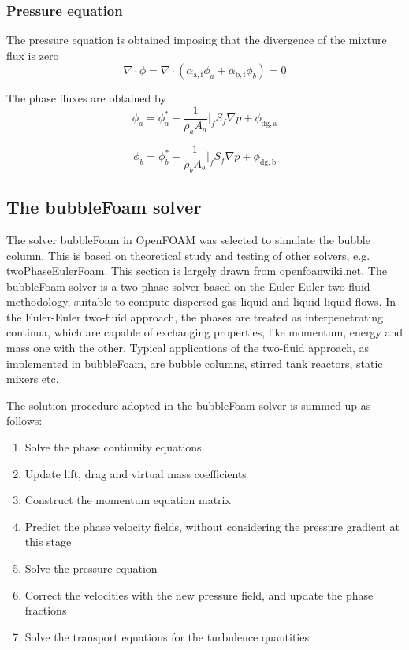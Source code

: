 \documentclass[11pt, a4paper, twoside]{article}
\begin{document}
\subsubsection{Pressure equation}
The pressure equation is obtained imposing that the divergence of the mixture flux is zero
\begin{equation}
\nabla\cdot\phi=\nabla\cdot(\alpha_\mathrm{a,f} \phi_a+\alpha_\mathrm{b,f} \phi_b)=0
\end{equation}

The phase fluxes are obtained by
\begin{equation}
\phi_a=\phi_a^*-\frac{1}{\rho_a A_a}|_f S_f\nabla p+\phi_\mathrm{dg,a}
\end{equation}

\begin{equation}
\phi_b=\phi_b^*-\frac{1}{\rho_b A_b}|_f S_f\nabla p+\phi_\mathrm{dg,b}
\end{equation}

\subsection{The bubbleFoam solver} \label{sec:bubbleFoam}
The solver bubbleFoam in OpenFOAM was selected to simulate the bubble column. This is based on theoretical study and testing of other solvers, e.g. twoPhaseEulerFoam. This section is largely drawn from openfoanwiki.net. The bubbleFoam solver is a two-phase solver based on the Euler-Euler two-fluid methodology, suitable to compute dispersed gas-liquid and liquid-liquid flows. In the Euler-Euler two-fluid approach, the phases are treated as interpenetrating continua, which are capable of exchanging properties, like momentum, energy and mass one with the other. Typical applications of the two-fluid approach, as implemented in bubbleFoam, are bubble columns, stirred tank reactors, static mixers etc.

The solution procedure adopted in the bubbleFoam solver is summed up as follows:
\begin{enumerate}
    \item{Solve the phase continuity equations}
    \item{Update lift, drag and virtual mass coefficients}
    \item{Construct the momentum equation matrix}
    \item{Predict the phase velocity fields, without considering the pressure gradient at this stage}
    \item{Solve the pressure equation}
    \item{Correct the velocities with the new pressure field, and update the phase fractions}
    \item{Solve the transport equations for the turbulence quantities}
\end{enumerate}
\end{document}
